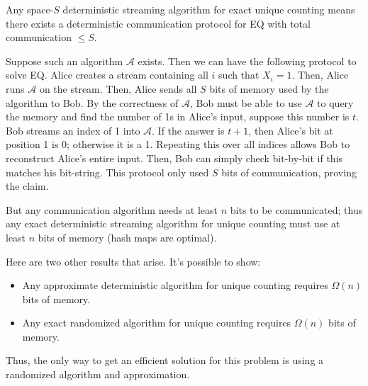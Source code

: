 \begin{theorem}
    Any space-$S$ deterministic streaming algorithm for exact unique counting means there exists a deterministic communication protocol for EQ with total communication $\leq S$.

    \begin{proof*}
        Suppose such an algorithm $\mathcal{A}$ exists. Then we can have the following protocol to solve EQ. Alice creates a stream containing all $i$ such that $X_i = 1$.
        Then, Alice runs $\mathcal{A}$ on the stream. Then, Alice sends all $S$ bits of memory used by the algorithm to Bob. By the correctness of $\mathcal{A}$, Bob must be able to use $\mathcal{A}$ to query
        the memory and find the number of 1s in Alice's input, suppose this number is $t$. Bob streams an index of 1 into $\mathcal{A}$. If the answer is $t+1$, then Alice's bit at position 1 is 0; otherwise it is a 1.
        Repeating this over all indices allows Bob to reconstruct Alice's entire input. Then, Bob can simply check bit-by-bit if this matches his bit-string. This protocol only used $S$ bits of communication, proving the claim.
    \end{proof*}
\end{theorem}

But any communication algorithm needs at least $n$ bits to be communicated; thus any exact deterministic streaming algorithm for unique counting must use at least $n$ bits of memory (hash maps are optimal).

Here are two other results that arise. It's possible to show:

\begin{theorem}
    \begin{itemize}
        \item Any approximate deterministic algorithm for unique counting requires $\Omega(n)$ bits of memory.
        \item Any exact randomized algorithm for unique counting requires $\Omega(n)$ bits of memory.
    \end{itemize}
\end{theorem}

Thus, the only way to get an efficient solution for this problem is using a randomized algorithm and approximation.